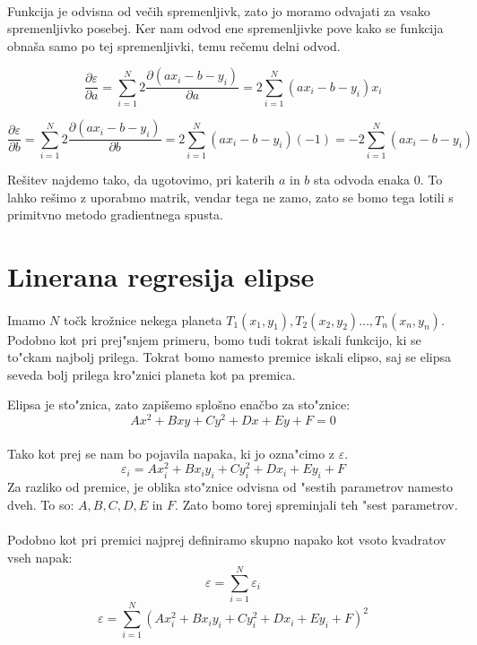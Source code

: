 \documentclass[a4paper, 12pt]{article}
\begin{document}
	\paragraph{}
	Funkcija je odvisna od večih spremenljivk, zato jo moramo odvajati za vsako spremenljivko posebej. Ker nam odvod ene spremenljivke pove kako se funkcija obnaša samo po tej spremenljivki, temu rečemu delni odvod.
	
	
	$$\frac{\partial \varepsilon}{\partial a} =
	\sum_{i=1}^{N} 2 \frac{\partial (a x_i - b - y_i)}{\partial a} =
	2 \sum_{i=1}^{N} (a x_i - b - y_i)x_i$$
	
	$$\frac{\partial \varepsilon}{\partial b} =
	\sum_{i=1}^{N} 2 \frac{\partial (a x_i - b - y_i)}{\partial b} =
	2 \sum_{i=1}^{N} (a x_i - b - y_i)(-1) = -2 \sum_{i=1}^{N} (a x_i - b - y_i)$$
	
	Rešitev najdemo tako, da ugotovimo, pri katerih $a$ in $b$ sta odvoda enaka 0. To lahko rešimo z uporabmo matrik, vendar tega ne zamo, zato se bomo tega lotili s primitvno metodo gradientnega spusta.
	
	
	\section*{Linerana regresija elipse}
	\paragraph{}
	Imamo $N$ točk krožnice nekega planeta $T_1(x_1, y_1), T_2(x_2, y_2) \ldots, T_n(x_n, y_n)$. Podobno kot pri prej"snjem primeru, bomo tudi tokrat iskali funkcijo, ki se to"ckam najbolj prilega. Tokrat bomo namesto premice iskali elipso, saj se elipsa seveda bolj prilega kro"znici planeta kot pa premica.
	
	
	Elipsa je sto"znica, zato zapišemo splošno enačbo za sto"znice:
	$$Ax^2 + Bxy + Cy^2 + Dx + Ey + F = 0$$
	
	\paragraph{}
	Tako kot prej se nam bo pojavila napaka, ki jo ozna"cimo z $\varepsilon$.
	$$\varepsilon_i = Ax_i^2 + Bx_iy_i + Cy_i^2 + Dx_i + Ey_i + F$$
	Za razliko od premice, je oblika sto"znice odvisna od "sestih parametrov namesto dveh. To so: $A, B, C, D, E$ in $F$. Zato bomo torej spreminjali teh "sest parametrov.
	
	\paragraph{}
	Podobno kot pri premici najprej definiramo skupno napako kot vsoto kvadratov vseh napak:
	\[\varepsilon = \sum_{i=1}^{N}\varepsilon_i\]
	\[\varepsilon = \sum_{i=1}^{N} (Ax_i^2 + Bx_iy_i + Cy_i^2 + Dx_i + Ey_i + F)^2\]
	
\end{document}
